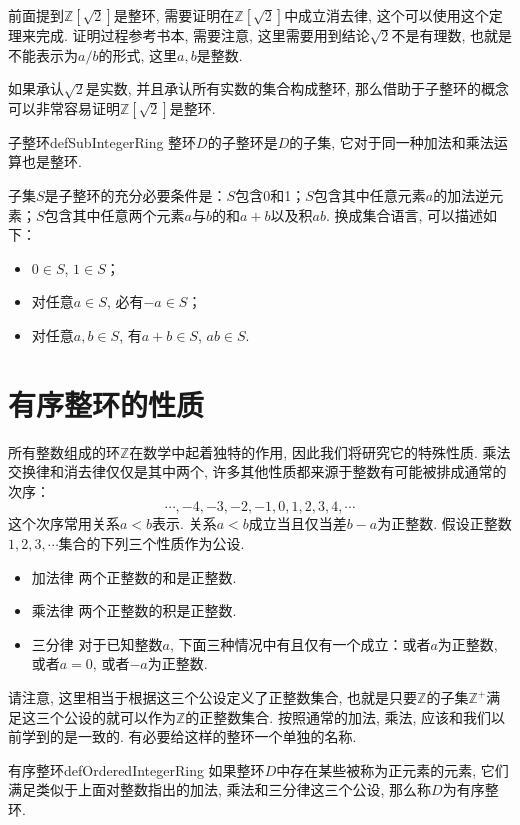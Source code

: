 前面提到$\mathbb{Z}[\sqrt{2}]$是整环, 需要证明在$\mathbb{Z}[\sqrt{2}]$中成立消去律, 这个可以使用这个定理来完成. 证明过程参考书本, 需要注意, 这里需要用到结论$\sqrt{2}$不是有理数, 也就是不能表示为$a/b$的形式, 这里$a, b$是整数. 

如果承认$\sqrt{2}$是实数, 并且承认所有实数的集合构成整环, 那么借助于子整环的概念可以非常容易证明$\mathbb{Z}[\sqrt{2}]$是整环. 
\begin{definition}{子整环}{defSubIntegerRing}
整环$D$的子整环是$D$的子集, 它对于同一种加法和乘法运算也是整环. 
\end{definition}

子集$S$是子整环的充分必要条件是：$S$包含0和1；$S$包含其中任意元素$a$的加法逆元素；$S$包含其中任意两个元素$a$与$b$的和$a+b$以及积$ab$. 换成集合语言, 可以描述如下：
\begin{itemize}
\item $0 \in S$, $1 \in S$；
\item 对任意$a \in S$, 必有$-a \in S$；
\item 对任意$a, b \in S$, 有$a + b \in S$, $ab \in S$. 
\end{itemize}


\section{有序整环的性质}\label{section00103}
所有整数组成的环$\mathbb{Z}$在数学中起着独特的作用, 因此我们将研究它的特殊性质. 乘法交换律和消去律仅仅是其中两个, 许多其他性质都来源于整数有可能被排成通常的次序：
\[
\cdots,-4,-3,-2,-1,0,1,2,3,4,\cdots
\]
这个次序常用关系$a<b$表示. 关系$a<b$成立当且仅当差$b-a$为正整数. 假设正整数$1,2,3,\cdots$集合的下列三个性质作为公设. 
\begin{itemize}
\item 加法律 两个正整数的和是正整数. 
\item 乘法律 两个正整数的积是正整数. 
\item 三分律 对于已知整数$a$, 下面三种情况中有且仅有一个成立：或者$a$为正整数, 或者$a=0$, 或者$-a$为正整数. 
\end{itemize}

请注意, 这里相当于根据这三个公设定义了正整数集合, 也就是只要$\mathbb{Z}$的子集$\mathbb{Z}^+$满足这三个公设的就可以作为$\mathbb{Z}$的正整数集合. 按照通常的加法, 乘法, 应该和我们以前学到的是一致的. 有必要给这样的整环一个单独的名称. 

\begin{definition}{有序整环}{defOrderedIntegerRing}
如果整环$D$中存在某些被称为正元素的元素, 它们满足类似于上面对整数指出的加法, 乘法和三分律这三个公设, 那么称$D$为有序整环. 
\end{definition}

